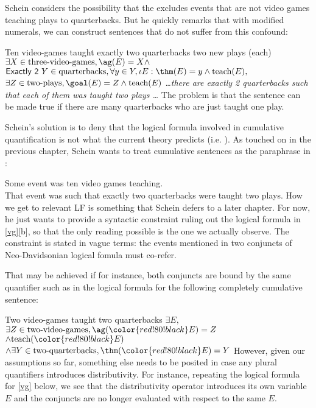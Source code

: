 Schein considers the possibility that the  excludes events that are not video games teaching plays to quarterbacks. But he quickly remarks that with modified numerals, we can construct sentences that do not suffer from this confound:

\pex \label{vg}
\a
Ten video-games taught exactly two quarterbacks two new plays (each)
\a
$\exists X\in \text{three-video-games}, \ag(E) = X \wedge $\\
$\textsf{Exactly 2 } Y\in \text{quarterbacks}, \forall y \in Y, \iota E: \thm(E) = y \wedge \text{teach}(E),$\\
$\exists Z\in \text{two-plays}, \goal(E) = Z \wedge \text{teach}(E)$
\a  
\emph{\ldots there are exactly 2 quarterbacks such that each of them was taught two plays \ldots}
\xe
%
The problem is that the sentence can be made true if there are many quarterbacks who are just taught one play.

Schein's solution is to deny that the logical formula involved in cumulative quantification is not what the current theory predicts (i.e. \clastxb). As touched on in the previous chapter, Schein wants to treat cumulative sentences as the paraphrase in \cnextx:

\ex
Some event was ten video games teaching.\\
That event was such that exactly two quarterbacks were taught two plays.
\xe
%
How we get to relevant LF is something that Schein defers to a later chapter. For now, he just wants to provide a syntactic constraint ruling out the logical formula in \cref{vg}[b], so that the only reading possible is the one we actually observe. The constraint is stated in vague terms: the events mentioned in two conjuncts of Neo-Davidsonian logical fomula must co-refer. 

That may be achieved if for instance, both conjuncts are bound by the same quantifier such as in the logical formula for the following completely cumulative sentence:

\pex
\a
Two video-games taught two quarterbacks
\a 
$\exists E,$\\
$\exists Z\in \text{two-video-games}, \ag({\color{red!80!black} E}) = Z$\\
$\wedge\text{teach}({\color{red!80!black} E})$\\
$\wedge\exists Y\in \text{two-quarterbacks}, \thm({\color{red!80!black} E}) = Y$
\xe
%
However, given our assumptions so far, something else needs to be posited in case any plural quantifiers introduces distributivity. For instance, repeating the logical formula for \cref{vg} below, we see that the distributivity operator introduces its own variable $E$ and the conjuncts are no longer evaluated with respect to the same $E$.

